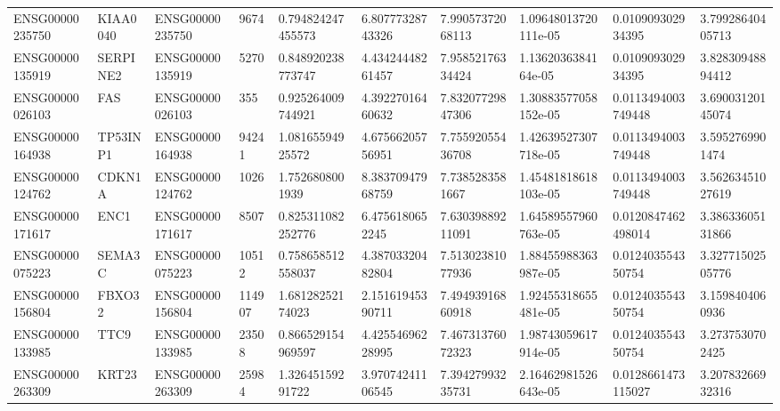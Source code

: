 \begin{tabular}{@{}llllllllll@{}}
ENSG00000235750 & KIAA0040 & ENSG00000235750 & 9674 & 0.794824247455573 & 6.80777328743326 & 7.99057372068113 & 1.09648013720111e-05 & 0.010909302934395 & 3.79928640405713 \\
ENSG00000135919 & SERPINE2 & ENSG00000135919 & 5270 & 0.848920238773747 & 4.43424448261457 & 7.95852176334424 & 1.1362036384164e-05 & 0.010909302934395 & 3.82830948894412 \\
ENSG00000026103 & FAS & ENSG00000026103 & 355 & 0.925264009744921 & 4.39227016460632 & 7.83207729847306 & 1.30883577058152e-05 & 0.0113494003749448 & 3.69003120145074 \\
ENSG00000164938 & TP53INP1 & ENSG00000164938 & 94241 & 1.08165594925572 & 4.67566205756951 & 7.75592055436708 & 1.42639527307718e-05 & 0.0113494003749448 & 3.5952769901474 \\
ENSG00000124762 & CDKN1A & ENSG00000124762 & 1026 & 1.7526808001939 & 8.38370947968759 & 7.7385283581667 & 1.45481818618103e-05 & 0.0113494003749448 & 3.56263451027619 \\
ENSG00000171617 & ENC1 & ENSG00000171617 & 8507 & 0.825311082252776 & 6.4756180652245 & 7.63039889211091 & 1.64589557960763e-05 & 0.0120847462498014 & 3.38633605131866 \\
ENSG00000075223 & SEMA3C & ENSG00000075223 & 10512 & 0.758658512558037 & 4.38703320482804 & 7.51302381077936 & 1.88455988363987e-05 & 0.012403554350754 & 3.32771502505776 \\
ENSG00000156804 & FBXO32 & ENSG00000156804 & 114907 & 1.68128252174023 & 2.15161945390711 & 7.49493916860918 & 1.92455318655481e-05 & 0.012403554350754 & 3.1598404060936 \\
ENSG00000133985 & TTC9 & ENSG00000133985 & 23508 & 0.866529154969597 & 4.42554696228995 & 7.46731376072323 & 1.98743059617914e-05 & 0.012403554350754 & 3.2737530702425 \\
ENSG00000263309 & KRT23 & ENSG00000263309 & 25984 & 1.32645159291722 & 3.97074241106545 & 7.39427993235731 & 2.16462981526643e-05 & 0.0128661473115027 & 3.20783266932316 \\
\bottomrule
\end{tabular}
\endgroup
